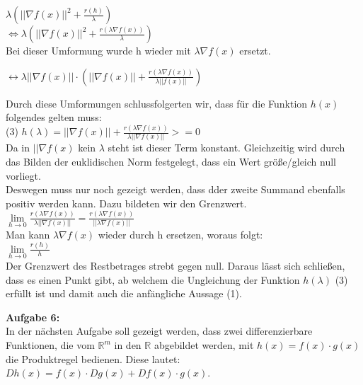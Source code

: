 \documentclass{article}
\begin{document}
$\lambda (||\nabla f(x)||^2 + \frac{r(h)}{\lambda})$ \\

$\Leftrightarrow \lambda(||\nabla f(x)||^2 + \frac{r(\lambda \nabla f(x))}{\lambda})$ \\

Bei dieser Umformung wurde h wieder mit $\lambda\nabla f(x)$ ersetzt.

$\leftrightarrow \lambda ||\nabla f(x)|| \cdot (||\nabla f(x)|| + \frac{r(\lambda \nabla f(x))}{\lambda || f(x)||})$


Durch diese Umformungen schlussfolgerten wir, dass f\"ur die Funktion $h(x)$ folgendes gelten muss:\\
(3) $h(\lambda)=||\nabla f(x)|| + \frac{r(\lambda\nabla f(x))}{\lambda||\nabla f(x)||} >=0$ \\

Da in $||\nabla f(x)$ kein $\lambda$ steht ist dieser Term konstant. Gleichzeitig wird durch das Bilden der euklidischen Norm festgelegt, dass ein Wert größe/gleich null vorliegt. \\ %
Deswegen muss nur noch gezeigt werden, dass dder zweite Summand ebenfalls positiv werden kann. Dazu bildeten wir den Grenzwert. \\ %
$\lim\limits_{h \rightarrow 0}{\frac{r(\lambda \nabla f(x))}{\lambda ||\nabla f(x)||}} = \frac{r(\lambda \nabla f(x))}{||\lambda  \nabla f(x)||}$ \\ %

Man kann $\lambda \nabla f(x)$ wieder durch h ersetzen, woraus folgt: \\
$\lim\limits_{h \rightarrow 0} \frac{r(h)}{h}$ \\

Der Grenzwert des Restbetrages strebt gegen null. Daraus lässt sich schließen, dass es einen Punkt gibt, ab welchem die Ungleichung der Funktion $h(\lambda)$ (3) erfüllt ist und damit auch die anfängliche Aussage (1). \\ %
\vspace{15pt}

\textbf{Aufgabe 6:} \\

In der n\"achsten Aufgabe soll gezeigt werden, dass zwei differenzierbare Funktionen, die vom $\mathds{R}^m$ in den $\mathds{R}$ abgebildet werden, mit $h(x) = f(x) \cdot g(x)$ die Produktregel bedienen. Diese lautet: $Dh(x) = f(x) \cdot Dg(x) + Df(x) \cdot g(x)$.
\end{document}
